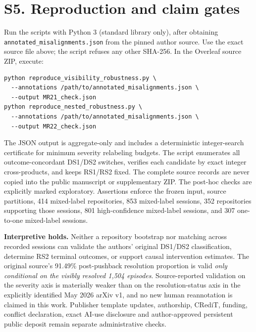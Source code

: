 \documentclass[10pt,a4paper]{article}
\begin{document}
\section*{S5. Reproduction and claim gates}
Run the scripts with Python 3 (standard library only), after obtaining \texttt{annotated\_misalignments.json} from the pinned author source. Use the exact source file above; the script refuses any other SHA-256. In the Overleaf source ZIP, execute:
\begin{verbatim}
python reproduce_visibility_robustness.py \
  --annotations /path/to/annotated_misalignments.json \
  --output MR21_check.json
python reproduce_nested_robustness.py \
  --annotations /path/to/annotated_misalignments.json \
  --output MR22_check.json
\end{verbatim}
The JSON output is aggregate-only and includes a deterministic integer-search certificate for minimum severity relabeling budgets. The script enumerates all outcome-concordant DS1/DS2 switches, verifies each candidate by exact integer cross-products, and keeps RS1/RS2 fixed. The complete source records are never copied into the public manuscript or supplementary ZIP. The post-hoc checks are explicitly marked exploratory. Assertions enforce the frozen input, source partitions, 414 mixed-label repositories, 853 mixed-label sessions, 352 repositories supporting those sessions, 801 high-confidence mixed-label sessions, and 307 one-to-one mixed-label sessions.

\noindent\textbf{Interpretive holds.} Neither a repository bootstrap nor matching across recorded sessions can validate the authors' original DS1/DS2 classification, determine RS2 terminal outcomes, or support causal intervention estimates. The original source's 91.49\% post-pushback resolution proportion is valid \emph{only conditional on the visibly resolved 1,504 episodes}. Source-reported validation on the severity axis is materially weaker than on the resolution-status axis in the explicitly identified May 2026 arXiv v1, and no new human reannotation is claimed in this work. Publisher template updates, authorship, CRediT, funding, conflict declaration, exact AI-use disclosure and author-approved persistent public deposit remain separate administrative checks.
\end{document}
